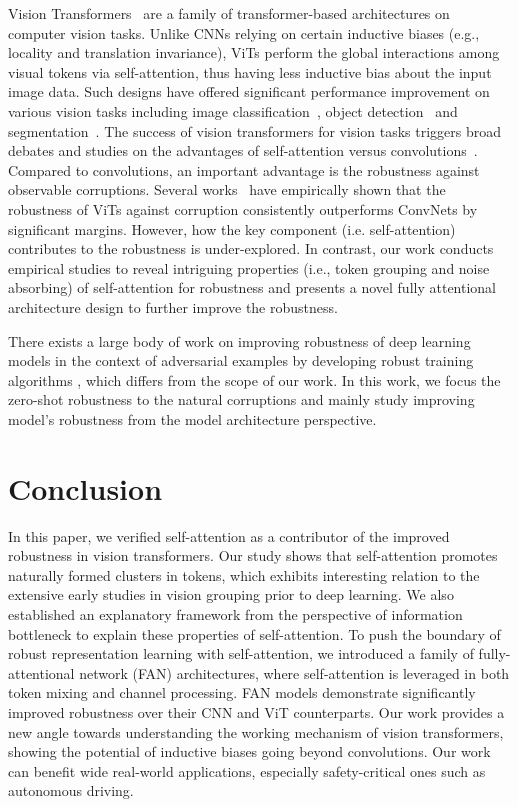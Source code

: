 \documentclass[nohyperref]{article}
\theoremstyle{plain}
\theoremstyle{definition}
\theoremstyle{remark}
\begin{document}
Vision Transformers~\cite{vaswani2017attention} are a family of transformer-based architectures  on computer vision tasks.
Unlike CNNs relying on certain inductive biases (e.g., locality and  translation invariance), ViTs perform the global interactions among visual tokens  via self-attention, thus having less inductive bias about the input image data. Such designs have offered significant performance improvement on various vision tasks including image classification~\cite{dosovitskiy2020image,yuan2021tokens,zhou2021deepvit, zhou2021refiner}, object detection~\cite{carion2020end,zhu2020deformable,dai2020up,zheng2020end} and segmentation~\cite{wang2020end,liu2021swin, zheng2020end}. The success of vision transformers for vision tasks triggers
broad debates and studies on the advantages of self-attention
versus convolutions~\cite{raghu2021vision,tang2021sparse}. Compared to convolutions, an important advantage is the robustness against observable corruptions. Several works~\cite{bai2021transformers,xie2021segformer,paul2022vision,naseer2021intriguing} have empirically shown that the robustness of ViTs against corruption  consistently outperforms ConvNets by significant margins.
However, how the key component (i.e. self-attention) contributes to the robustness is under-explored.  In contrast, our work conducts empirical studies to reveal
intriguing properties (i.e., token grouping
and noise absorbing) of self-attention for robustness and presents a novel fully attentional architecture design to further improve the robustness. 

There exists a large body of work on improving robustness of deep learning models in the context of adversarial examples by developing robust training algorithms \cite{kurakin2016adversarial,shao2021adversarial},  which differs from the scope of our work. In this work, we focus the zero-shot robustness to the natural corruptions and mainly study improving model's robustness from the  model architecture   perspective.  
\section{Conclusion}
In this paper, we verified self-attention as a contributor of the improved robustness in vision transformers. 
Our study shows that self-attention promotes naturally formed clusters in tokens, which exhibits interesting relation to the extensive early studies in vision grouping prior to deep learning. We also established an explanatory framework from the perspective of information bottleneck to explain these  properties of self-attention. To push the boundary of robust representation learning with self-attention, we introduced a family of fully-attentional network (FAN) architectures, where self-attention is leveraged in both token mixing and channel processing. FAN models demonstrate significantly improved robustness over their CNN and ViT counterparts. Our work provides a new angle towards understanding the working mechanism of vision transformers, showing the potential of inductive biases going beyond convolutions. Our work can benefit wide real-world applications, especially safety-critical ones such as autonomous driving.


\end{document}
